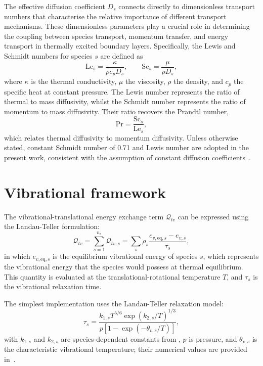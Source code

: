 The effective diffusion coefficient $D_s$ connects directly to dimensionless transport numbers that characterise the relative importance of different transport mechanisms. These dimensionless parameters play a crucial role in determining the coupling between species transport, momentum transfer, and energy transport in thermally excited boundary layers. Specifically, the Lewis and Schmidt numbers for species $s$ are defined as
\begin{equation}
    \mathrm{Le}_s = \frac{\kappa}{\rho c_p D_s},
    \qquad
    \mathrm{Sc}_s = \frac{\mu}{\rho D_s},
    \label{eq:le_sc}
\end{equation}
where $\kappa$ is the thermal conductivity, $\mu$ the viscosity, $\rho$ the density, and $c_p$ the specific heat at constant pressure. The Lewis number represents the ratio of thermal to mass diffusivity, whilst the Schmidt number represents the ratio of momentum to mass diffusivity. Their ratio recovers the Prandtl number,
\begin{equation}
    \mathrm{Pr} = \frac{\mathrm{Sc}_s}{\mathrm{Le}_s},
    \label{eq:prandtl}
\end{equation}
which relates thermal diffusivity to momentum diffusivity. Unless otherwise stated, constant Schmidt number of 0.71 and Lewis number are adopted in the present work, consistent with the assumption of constant diffusion coefficients~\citep{ZhangZhang2022}. 

\section{Vibrational framework}\label{section:vibrationalrelaxation}
The vibrational-translational energy exchange term $\mathcal{Q}_{tv}$ can be expressed using the Landau-Teller formulation:
\begin{equation}
    \mathcal{Q}_{tv} = \sum_{s=1}^{n_s} \mathcal{Q}_{tv,s} = \sum_{s} \rho_s \frac{e_{v,\text{eq},s} - e_{v,s}}{\tau_s},
\end{equation}
in which $e_{v,\text{eq},s}$ is the equilibrium vibrational energy of species $s$, which represents the vibrational energy that the species would possess at thermal equilibrium. This quantity is evaluated at the translational-rotational temperature $T$, and $\tau_s$ is the vibrational relaxation time.

The simplest implementation uses the Landau-Teller relaxation model:
\begin{equation}
    \tau_s = \frac{k_{1,s} T^{5/6} \exp\left(k_{2,s}/T\right)^{1/3}}{p \left[ 1 - \exp\left(-\theta_{v,s}/T\right) \right]},
\end{equation} with $k_{1,s}$ and $k_{2,s}$ are species-dependent constants from \cite{Vincenti1965}, $p$ is pressure, and $\theta_{v,s}$ is the characteristic vibrational temperature; their numerical values are provided in~.

